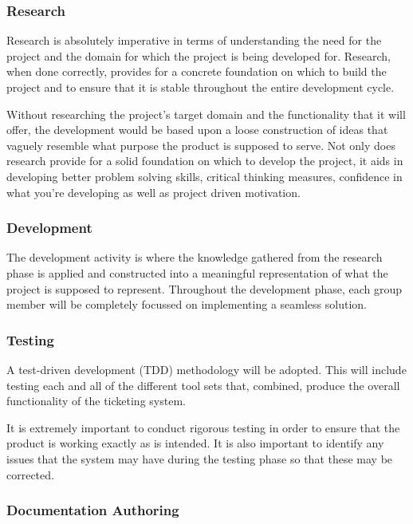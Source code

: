 \documentclass[a4paper,12pt]{article}
\begin{document}
\subsubsection{Research}\label{research}

Research is absolutely imperative in terms of understanding the need for
the project and the domain for which the project is being developed for.
Research, when done correctly, provides for a concrete foundation on
which to build the project and to ensure that it is stable throughout
the entire development cycle.

Without researching the project's target domain and the functionality
that it will offer, the development would be based upon a loose
construction of ideas that vaguely resemble what purpose the product is
supposed to serve. Not only does research provide for a solid foundation
on which to develop the project, it aids in developing better problem
solving skills, critical thinking measures, confidence in what you're
developing as well as project driven motivation.

\subsubsection{Development}\label{development}

The development activity is where the knowledge gathered from the
research phase is applied and constructed into a meaningful
representation of what the project is supposed to represent. Throughout
the development phase, each group member will be completely focussed on
implementing a seamless solution.

\subsubsection{Testing}\label{testing}

A test-driven development (TDD) methodology will be adopted. This will
include testing each and all of the different tool sets that, combined,
produce the overall functionality of the ticketing system.

It is extremely important to conduct rigorous testing in order to ensure
that the product is working exactly as is intended. It is also important
to identify any issues that the system may have during the testing phase
so that these may be corrected.

\subsubsection{Documentation Authoring}\label{documentation-authoring}
\end{document}
